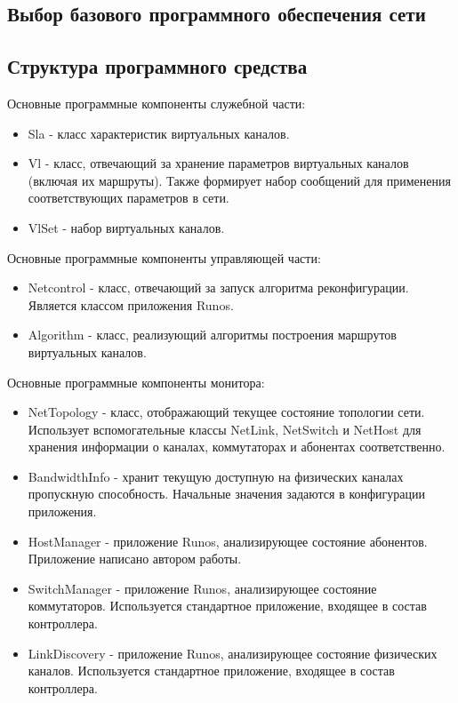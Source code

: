 \documentclass[12pt, a4paper]{article}
\begin{document}
\subsection{Выбор базового программного обеспечения сети}
\subsection{Структура программного средства}

Основные программные компоненты служебной части:
\begin{itemize}
	\item Sla - класс характеристик виртуальных каналов.
	\item Vl - класс, отвечающий за хранение параметров виртуальных каналов (включая их маршруты). Также формирует набор сообщений для применения соответствующих параметров в сети.
	\item VlSet - набор виртуальных каналов.
\end{itemize}

Основные программные компоненты управляющей части:
\begin{itemize}
	\item Netcontrol - класс, отвечающий за запуск алгоритма реконфигурации. Является классом приложения Runos.
	\item Algorithm - класс, реализующий алгоритмы построения маршрутов виртуальных каналов.
\end{itemize}


Основные программные компоненты монитора:
\begin{itemize}
	\item NetTopology - класс, отображающий текущее состояние топологии сети. Использует вспомогательные классы NetLink, NetSwitch и NetHost для хранения информации о каналах, коммутаторах и абонентах соответственно.
	\item BandwidthInfo - хранит текущую доступную на физических каналах пропускную способность. Начальные значения задаются в конфигурации приложения.
	\item HostManager - приложение Runos, анализирующее состояние абонентов. Приложение написано автором работы.
	\item SwitchManager - приложение Runos, анализирующее состояние коммутаторов. Используется стандартное приложение, входящее в состав контроллера.
	\item LinkDiscovery - приложение Runos, анализирующее состояние физических каналов. Используется стандартное приложение, входящее в состав контроллера.
\end{itemize}
\end{document}
